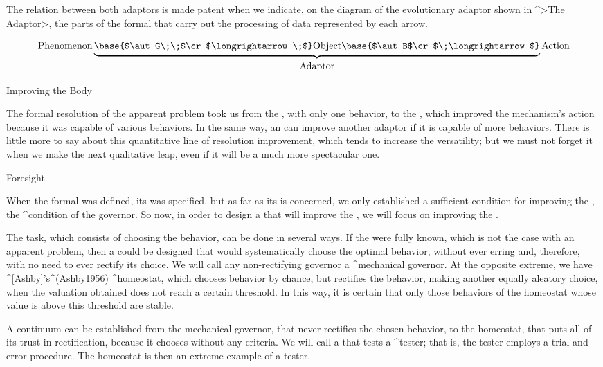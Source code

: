 The relation between both adaptors is made patent when we indicate, on
the diagram of the evolutionary adaptor shown in ^>The Adaptor>, the
parts of the formal {\adaptor} that carry out the processing of data
represented by each arrow.


\beginpoints
$$\hbox{Phenomenon}
  \underbrace{
   \base{$\aut G\;\;$\cr$\longrightarrow\;$}
   \hbox{\strut Object}
   \base{$\aut B$\cr$\;\longrightarrow$}}_{\hbox{\strut Adaptor}}
  \hbox{Action}
$$
\endpoints

\Section Improving the Body

The formal resolution of the apparent problem took us from the
{\mechanism}, with only one behavior, to the {\adaptor}, which improved
the mechanism's action because it was capable of various behaviors. In
the same way, an {\adaptor} can improve another adaptor if it is capable
of more behaviors. There is little more to say about this quantitative
line of resolution improvement, which tends to increase the {\bodys}
versatility; but we must not forget it when we make the next qualitative
leap, even if it will be a much more spectacular one.


\Section Foresight

When the formal {\adaptor} was defined, its {\body} was specified, but
as far as its {\governor} is concerned, we only established a sufficient
condition for improving the {\mechanism}, the ^{condition of the
governor}. So now, in order to design a {\learner} that will improve the
{\adaptor}, we will focus on improving the {\governor}.

The {\governors} task, which consists of choosing the {\bodys} behavior,
can be done in several ways. If the {\universe} were fully known, which
is not the case with an apparent problem, then a {\governor} could be
designed that would systematically choose the optimal behavior, without
ever erring and, therefore, with no need to ever rectify its choice. We
will call any non-rectifying governor a ^{mechanical governor}. At the
opposite extreme, we have ^[Ashby]'s^(Ashby1956) ^{homeostat}, which
chooses behavior by chance, but rectifies the behavior, making another
equally aleatory choice, when the valuation obtained does not reach a
certain threshold. In this way, it is certain that only those behaviors
of the homeostat whose value is above this threshold are stable.

A continuum can be established from the mechanical governor, that never
rectifies the chosen behavior, to the homeostat, that puts all of its
trust in rectification, because it chooses without any criteria. We will
call a {\governor} that tests a ^{tester}; that is, the tester employs a
trial-and-error procedure. The homeostat is then an extreme example of a
tester.

